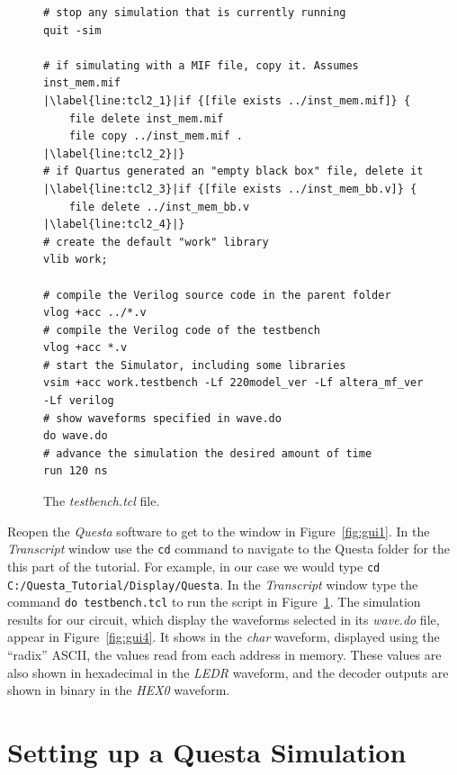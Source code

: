 \documentclass[11pt, twoside, pdftex]{article}
\begin{document}
\lstset{language=Tcl,numbers=left,escapechar=|}
\begin{figure}[b!]
\begin{center}
\begin{minipage}[t]{15 cm}
\begin{lstlisting}[name=tcl2]
# stop any simulation that is currently running
quit -sim

# if simulating with a MIF file, copy it. Assumes inst_mem.mif
|\label{line:tcl2_1}|if {[file exists ../inst_mem.mif]} {
	file delete inst_mem.mif
	file copy ../inst_mem.mif .
|\label{line:tcl2_2}|}
# if Quartus generated an "empty black box" file, delete it
|\label{line:tcl2_3}|if {[file exists ../inst_mem_bb.v]} {
	file delete ../inst_mem_bb.v
|\label{line:tcl2_4}|}
# create the default "work" library
vlib work;

# compile the Verilog source code in the parent folder
vlog +acc ../*.v
# compile the Verilog code of the testbench
vlog +acc *.v
# start the Simulator, including some libraries
vsim +acc work.testbench -Lf 220model_ver -Lf altera_mf_ver -Lf verilog
# show waveforms specified in wave.do
do wave.do
# advance the simulation the desired amount of time
run 120 ns
\end{lstlisting}
\end{minipage}
\caption{The {\it testbench.tcl} file.}
\label{fig:tcl2}
\end{center}
\end{figure}

\noindent
Reopen the {\it Questa} software to get to the window in Figure~\ref{fig:gui1}.
In the {\it Transcript} window use the \texttt{cd} command to navigate to the 
Questa folder for the this part of the tutorial. For example, in our 
case we would type \texttt{cd C:/Questa\_Tutorial/Display/Questa}. 
In the {\it Transcript} window type the command \texttt{do testbench.tcl} to run
the script in Figure~\ref{fig:tcl2}.
The simulation results for our circuit, which display the waveforms selected in its
{\it wave.do} file, appear in Figure~\ref{fig:gui4}. It shows in the {\it char} 
waveform, displayed using the ``radix'' ASCII, the values read from each address in memory.
These values are also shown in hexadecimal in the {\it LEDR} waveform, and the 
decoder outputs are shown in binary in the {\it HEX0} waveform.

\section{Setting up a Questa Simulation}
\end{document}
